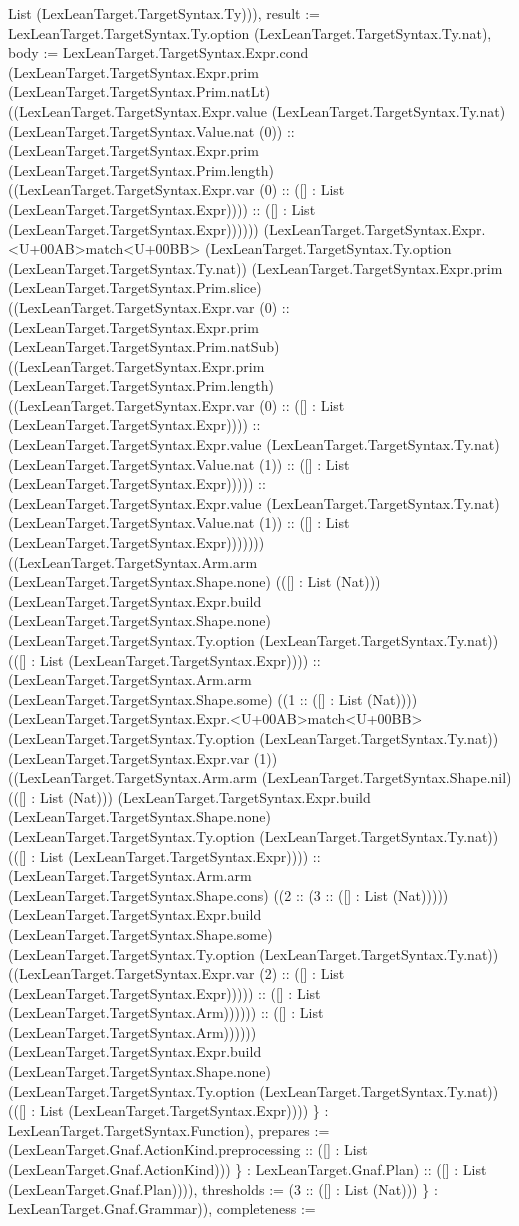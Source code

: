 \documentclass[11pt]{article}
\begin{document}
List (LexLeanTarget.TargetSyntax.Ty))), result := LexLeanTarget.TargetSyntax.Ty.option (LexLeanTarget.TargetSyntax.Ty.nat), body := LexLeanTarget.TargetSyntax.Expr.cond (LexLeanTarget.TargetSyntax.Expr.prim (LexLeanTarget.TargetSyntax.Prim.natLt) ((LexLeanTarget.TargetSyntax.Expr.value (LexLeanTarget.TargetSyntax.Ty.nat) (LexLeanTarget.TargetSyntax.Value.nat (0)) :: (LexLeanTarget.TargetSyntax.Expr.prim (LexLeanTarget.TargetSyntax.Prim.length) ((LexLeanTarget.TargetSyntax.Expr.var (0) :: ([] : List (LexLeanTarget.TargetSyntax.Expr)))) :: ([] : List (LexLeanTarget.TargetSyntax.Expr)))))) (LexLeanTarget.TargetSyntax.Expr.<U+00AB>match<U+00BB> (LexLeanTarget.TargetSyntax.Ty.option (LexLeanTarget.TargetSyntax.Ty.nat)) (LexLeanTarget.TargetSyntax.Expr.prim (LexLeanTarget.TargetSyntax.Prim.slice) ((LexLeanTarget.TargetSyntax.Expr.var (0) :: (LexLeanTarget.TargetSyntax.Expr.prim (LexLeanTarget.TargetSyntax.Prim.natSub) ((LexLeanTarget.TargetSyntax.Expr.prim (LexLeanTarget.TargetSyntax.Prim.length) ((LexLeanTarget.TargetSyntax.Expr.var (0) :: ([] : List (LexLeanTarget.TargetSyntax.Expr)))) :: (LexLeanTarget.TargetSyntax.Expr.value (LexLeanTarget.TargetSyntax.Ty.nat) (LexLeanTarget.TargetSyntax.Value.nat (1)) :: ([] : List (LexLeanTarget.TargetSyntax.Expr))))) :: (LexLeanTarget.TargetSyntax.Expr.value (LexLeanTarget.TargetSyntax.Ty.nat) (LexLeanTarget.TargetSyntax.Value.nat (1)) :: ([] : List (LexLeanTarget.TargetSyntax.Expr))))))) ((LexLeanTarget.TargetSyntax.Arm.arm (LexLeanTarget.TargetSyntax.Shape.none) (([] : List (Nat))) (LexLeanTarget.TargetSyntax.Expr.build (LexLeanTarget.TargetSyntax.Shape.none) (LexLeanTarget.TargetSyntax.Ty.option (LexLeanTarget.TargetSyntax.Ty.nat)) (([] : List (LexLeanTarget.TargetSyntax.Expr)))) :: (LexLeanTarget.TargetSyntax.Arm.arm (LexLeanTarget.TargetSyntax.Shape.some) ((1 :: ([] : List (Nat)))) (LexLeanTarget.TargetSyntax.Expr.<U+00AB>match<U+00BB> (LexLeanTarget.TargetSyntax.Ty.option (LexLeanTarget.TargetSyntax.Ty.nat)) (LexLeanTarget.TargetSyntax.Expr.var (1)) ((LexLeanTarget.TargetSyntax.Arm.arm (LexLeanTarget.TargetSyntax.Shape.nil) (([] : List (Nat))) (LexLeanTarget.TargetSyntax.Expr.build (LexLeanTarget.TargetSyntax.Shape.none) (LexLeanTarget.TargetSyntax.Ty.option (LexLeanTarget.TargetSyntax.Ty.nat)) (([] : List (LexLeanTarget.TargetSyntax.Expr)))) :: (LexLeanTarget.TargetSyntax.Arm.arm (LexLeanTarget.TargetSyntax.Shape.cons) ((2 :: (3 :: ([] : List (Nat))))) (LexLeanTarget.TargetSyntax.Expr.build (LexLeanTarget.TargetSyntax.Shape.some) (LexLeanTarget.TargetSyntax.Ty.option (LexLeanTarget.TargetSyntax.Ty.nat)) ((LexLeanTarget.TargetSyntax.Expr.var (2) :: ([] : List (LexLeanTarget.TargetSyntax.Expr))))) :: ([] : List (LexLeanTarget.TargetSyntax.Arm)))))) :: ([] : List (LexLeanTarget.TargetSyntax.Arm)))))) (LexLeanTarget.TargetSyntax.Expr.build (LexLeanTarget.TargetSyntax.Shape.none) (LexLeanTarget.TargetSyntax.Ty.option (LexLeanTarget.TargetSyntax.Ty.nat)) (([] : List (LexLeanTarget.TargetSyntax.Expr)))) \} : LexLeanTarget.TargetSyntax.Function), prepares := (LexLeanTarget.Gnaf.ActionKind.preprocessing :: ([] : List (LexLeanTarget.Gnaf.ActionKind))) \} : LexLeanTarget.Gnaf.Plan) :: ([] : List (LexLeanTarget.Gnaf.Plan)))), thresholds := (3 :: ([] : List (Nat))) \} : LexLeanTarget.Gnaf.Grammar)), completeness := 
\end{document}
